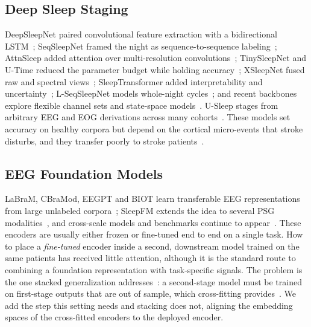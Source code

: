 \documentclass{ieeeaccess}
\begin{document}
\subsection{Deep Sleep Staging}
DeepSleepNet paired convolutional feature extraction with a bidirectional
LSTM~\cite{supratak2017deepsleepnet}; SeqSleepNet framed the night as sequence-to-sequence
labeling~\cite{phan2019seqsleepnet}; AttnSleep added attention over multi-resolution
convolutions~\cite{eldele2021attnsleep}; TinySleepNet and U-Time reduced the parameter budget
while holding accuracy~\cite{supratak2020tinysleepnet,perslev2019utime}; XSleepNet fused raw
and spectral views~\cite{phan2021xsleepnet}; SleepTransformer added interpretability and
uncertainty~\cite{sleeptransformer2022}; L-SeqSleepNet models whole-night
cycles~\cite{lseqsleepnet2023}; and recent backbones explore flexible channel sets and
state-space models~\cite{jirakittayakorn2024zleep,guo2024flexsleep,gu2023mamba,bitmamsleep2024}.
U-Sleep stages from arbitrary EEG and EOG derivations across many
cohorts~\cite{perslev2021usleep}. These models set accuracy on healthy corpora but depend on the
cortical micro-events that stroke disturbs, and they transfer poorly to stroke
patients~\cite{bose2026gap}.

\subsection{EEG Foundation Models}
LaBraM, CBraMod, EEGPT and BIOT learn transferable EEG representations from large unlabeled
corpora~\cite{labram2024,cbramod2025,eegpt2024,biot2023}; SleepFM extends the idea to several
PSG modalities~\cite{sleepfm2026}, and cross-scale models and benchmarks continue to
appear~\cite{csbrain2025,neuroatlas2026,sleepyland2026,estevan2025ssl}. These encoders are
usually either frozen or fine-tuned end to end on a single task. How to place a
\emph{fine-tuned} encoder inside a second, downstream model trained on the same patients has
received little attention, although it is the standard route to combining a foundation
representation with task-specific signals. The problem is the one stacked generalization
addresses~\cite{wolpert1992stacked}: a second-stage model must be trained on first-stage outputs
that are out of sample, which cross-fitting provides~\cite{chernozhukov2018dml}. We add the
step this setting needs and stacking does not, aligning the embedding spaces of the
cross-fitted encoders to the deployed encoder.
\end{document}
